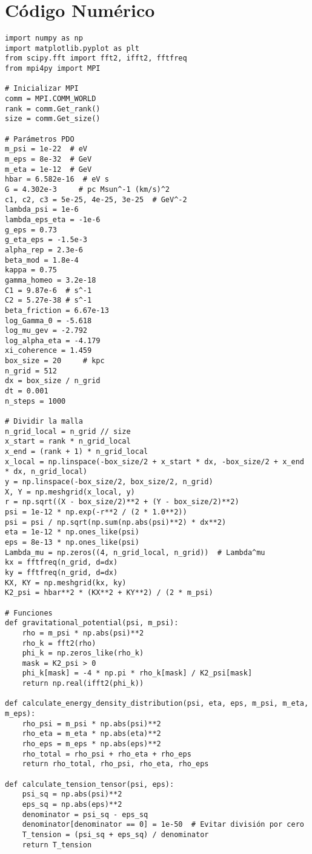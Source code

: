 \documentclass[a4paper,12pt]{article}
\begin{document}
\section{Código Numérico}
\begin{verbatim}
import numpy as np
import matplotlib.pyplot as plt
from scipy.fft import fft2, ifft2, fftfreq
from mpi4py import MPI

# Inicializar MPI
comm = MPI.COMM_WORLD
rank = comm.Get_rank()
size = comm.Get_size()

# Parámetros PDO
m_psi = 1e-22  # eV
m_eps = 8e-32  # GeV
m_eta = 1e-12  # GeV
hbar = 6.582e-16  # eV s
G = 4.302e-3     # pc Msun^-1 (km/s)^2
c1, c2, c3 = 5e-25, 4e-25, 3e-25  # GeV^-2
lambda_psi = 1e-6
lambda_eps_eta = -1e-6
g_eps = 0.73
g_eta_eps = -1.5e-3
alpha_rep = 2.3e-6
beta_mod = 1.8e-4
kappa = 0.75
gamma_homeo = 3.2e-18
C1 = 9.87e-6  # s^-1
C2 = 5.27e-38 # s^-1
beta_friction = 6.67e-13
log_Gamma_0 = -5.618
log_mu_gev = -2.792
log_alpha_eta = -4.179
xi_coherence = 1.459
box_size = 20     # kpc
n_grid = 512
dx = box_size / n_grid
dt = 0.001
n_steps = 1000

# Dividir la malla
n_grid_local = n_grid // size
x_start = rank * n_grid_local
x_end = (rank + 1) * n_grid_local
x_local = np.linspace(-box_size/2 + x_start * dx, -box_size/2 + x_end * dx, n_grid_local)
y = np.linspace(-box_size/2, box_size/2, n_grid)
X, Y = np.meshgrid(x_local, y)
r = np.sqrt((X - box_size/2)**2 + (Y - box_size/2)**2)
psi = 1e-12 * np.exp(-r**2 / (2 * 1.0**2))
psi = psi / np.sqrt(np.sum(np.abs(psi)**2) * dx**2)
eta = 1e-12 * np.ones_like(psi)
eps = 8e-13 * np.ones_like(psi)
Lambda_mu = np.zeros((4, n_grid_local, n_grid))  # Lambda^mu
kx = fftfreq(n_grid, d=dx)
ky = fftfreq(n_grid, d=dx)
KX, KY = np.meshgrid(kx, ky)
K2_psi = hbar**2 * (KX**2 + KY**2) / (2 * m_psi)

# Funciones
def gravitational_potential(psi, m_psi):
    rho = m_psi * np.abs(psi)**2
    rho_k = fft2(rho)
    phi_k = np.zeros_like(rho_k)
    mask = K2_psi > 0
    phi_k[mask] = -4 * np.pi * rho_k[mask] / K2_psi[mask]
    return np.real(ifft2(phi_k))

def calculate_energy_density_distribution(psi, eta, eps, m_psi, m_eta, m_eps):
    rho_psi = m_psi * np.abs(psi)**2
    rho_eta = m_eta * np.abs(eta)**2
    rho_eps = m_eps * np.abs(eps)**2
    rho_total = rho_psi + rho_eta + rho_eps
    return rho_total, rho_psi, rho_eta, rho_eps

def calculate_tension_tensor(psi, eps):
    psi_sq = np.abs(psi)**2
    eps_sq = np.abs(eps)**2
    denominator = psi_sq - eps_sq
    denominator[denominator == 0] = 1e-50  # Evitar división por cero
    T_tension = (psi_sq + eps_sq) / denominator
    return T_tension


\end{verbatim}
\end{document}
